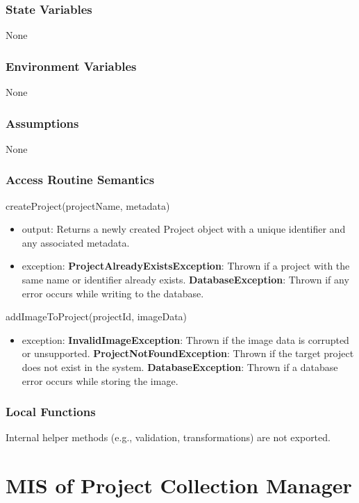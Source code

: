 \documentclass[12pt, titlepage]{article}
\begin{document}
    \subsubsection{State Variables}
        None

    \subsubsection{Environment Variables}
        None

    \subsubsection{Assumptions}
        None

    \subsubsection{Access Routine Semantics}
        \noindent createProject(projectName, metadata)
        \begin{itemize}
            \item output: Returns a newly created Project object with a unique identifier and any associated metadata.
            \item exception: \textbf{ProjectAlreadyExistsException}: Thrown if a project with the same name or identifier already exists. \textbf{DatabaseException}: Thrown if any error occurs while writing to the database.
        \end{itemize}
        \noindent addImageToProject(projectId, imageData)
        \begin{itemize}
            \item exception: \textbf{InvalidImageException}: Thrown if the image data is corrupted or unsupported. \textbf{ProjectNotFoundException}: Thrown if the target project does not exist in the system. \textbf{DatabaseException}: Thrown if a database error occurs while storing the image.
        \end{itemize}

    \subsubsection{Local Functions}
        Internal helper methods (e.g., validation, transformations) are not exported.

\section{MIS of Project Collection Manager} \label{pcm} 
\end{document}
